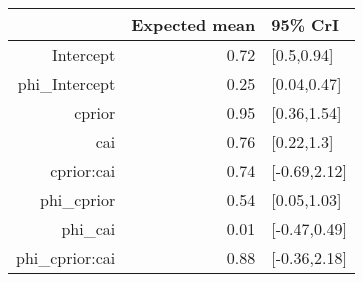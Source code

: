 \begin{tabular}{rrl}
  \hline
 & Expected mean & 95\% CrI \\ 
  \hline
Intercept & 0.72 & [0.5,0.94] \\ 
  phi\_Intercept & 0.25 & [0.04,0.47] \\ 
  cprior & 0.95 & [0.36,1.54] \\ 
  cai & 0.76 & [0.22,1.3] \\ 
  cprior:cai & 0.74 & [-0.69,2.12] \\ 
  phi\_cprior & 0.54 & [0.05,1.03] \\ 
  phi\_cai & 0.01 & [-0.47,0.49] \\ 
  phi\_cprior:cai & 0.88 & [-0.36,2.18] \\ 
   \hline
\end{tabular}

